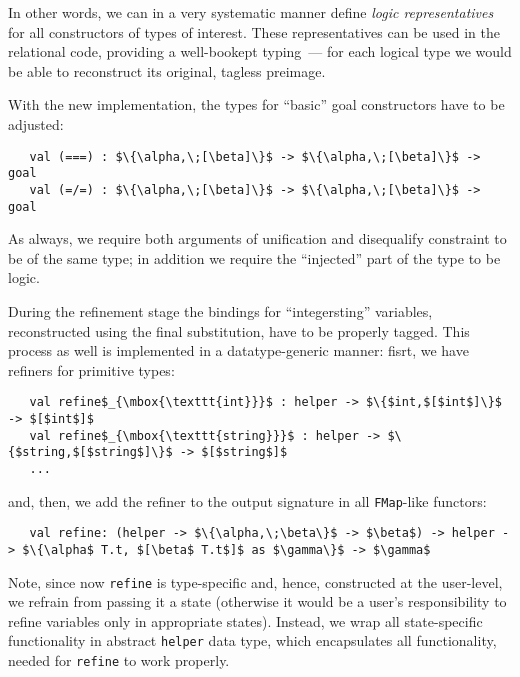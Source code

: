 In other words, we can in a very systematic manner define \emph{logic representatives} for all constructors
of types of interest. These representatives can be used in the relational code, providing a well-bookept
typing~--- for each logical type we would be able to reconstruct its original, tagless preimage. 

With the new implementation, the types for ``basic'' goal constructors have to be adjusted:

\begin{lstlisting}
   val (===) : $\{\alpha,\;[\beta]\}$ -> $\{\alpha,\;[\beta]\}$ -> goal
   val (=/=) : $\{\alpha,\;[\beta]\}$ -> $\{\alpha,\;[\beta]\}$ -> goal
\end{lstlisting}

As always, we require both arguments of unification and disequalify constraint to be of the same type; in addition
we require the ``injected'' part of the type to be logic.

During the refinement stage the bindings for ``integersting'' variables, reconstructed using the final
substitution, have to be properly tagged. This process as well is implemented in a datatype-generic manner:
fisrt, we have refiners for primitive types:

\begin{lstlisting}
   val refine$_{\mbox{\texttt{int}}}$ : helper -> $\{$int,$[$int$]\}$ -> $[$int$]$
   val refine$_{\mbox{\texttt{string}}}$ : helper -> $\{$string,$[$string$]\}$ -> $[$string$]$
   ...  
\end{lstlisting}

and, then, we add the refiner to the output signature in all \lstinline{FMap}-like functors:

\begin{lstlisting}
   val refine: (helper -> $\{\alpha,\;\beta\}$ -> $\beta$) -> helper -> $\{\alpha$ T.t, $[\beta$ T.t$]$ as $\gamma\}$ -> $\gamma$
\end{lstlisting}

Note, since now \lstinline{refine} is type-specific and, hence, constructed at the user-level, we refrain from passing 
it a state (otherwise it would be a user's responsibility to refine variables only in appropriate states). 
Instead, we wrap all state-specific functionality in abstract \lstinline{helper} data type, which encapsulates
all functionality, needed for \lstinline{refine} to work properly.
